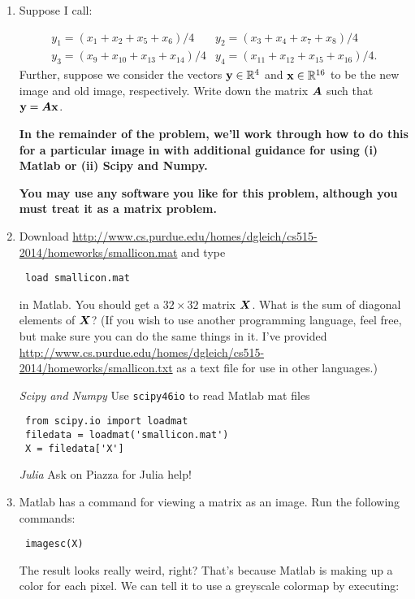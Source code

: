 \documentclass{article}
\begin{document}
\begin{enumerate}%
\item Suppose I call:

\begin{displaymath}
\begin{matrix}     y_1 = (x_1 + x_2 + x_5 + x_6)/4 & y_2 = (x_3 + x_4 + x_7 + x_8)/4 \\
    y_3 = (x_9 + x_{10} + x_{13} + x_{14})/4 & y_4 = (x_{11} + x_{12} + x_{15} + x_{16})/4. \end{matrix}
\end{displaymath}
Further, suppose we consider the vectors $\boldsymbol{\mathrm{y}} \in \mathbb{R}^{4}$ and $\boldsymbol{\mathrm{x}} \in \mathbb{R}^{16}$ to be the new image and old image, respectively. Write down the matrix $\boldsymbol{A}$ such that $\boldsymbol{\mathrm{y}} = \boldsymbol{A} \boldsymbol{\mathrm{x}}$.

\textbf{In the remainder of the problem, we'{}ll work through how to do this for a particular image in with additional guidance for using (i) Matlab or (ii) Scipy and Numpy.}

\textbf{You may use any software you like for this problem, although you must treat it as a matrix problem.}


\item Download \url{http://www.cs.purdue.edu/homes/dgleich/cs515-2014/homeworks/smallicon.mat} and type

\begin{verbatim} load smallicon.mat \end{verbatim}
in Matlab. You should get a $32 \times 32$ matrix $\boldsymbol{X}$. What is the sum of diagonal elements of $\boldsymbol{X}$? (If you wish to use another programming language, feel free, but make sure you can do the same things in it. I'{}ve provided \url{http://www.cs.purdue.edu/homes/dgleich/cs515-2014/homeworks/smallicon.txt} as a text file for use in other languages.)

\emph{Scipy and Numpy} Use {\colorbox[rgb]{1.00,0.93,1.00}{\tt scipy\char46io}} to read Matlab mat files

\begin{verbatim} from scipy.io import loadmat
 filedata = loadmat('smallicon.mat')
 X = filedata['X']\end{verbatim}
\emph{Julia} Ask on Piazza for Julia help!


\item Matlab has a command for viewing a matrix as an image. Run the following commands:

\begin{verbatim} imagesc(X)\end{verbatim}
The result looks really weird, right? That'{}s because Matlab is making up a color for each pixel. We can tell it to use a greyscale colormap by executing:


\end{enumerate}
\end{document}
